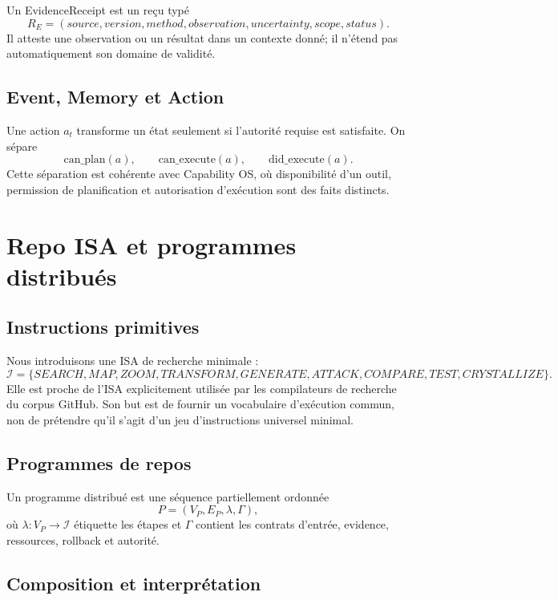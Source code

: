 \begin{definition}[EvidenceReceipt]
Un EvidenceReceipt est un reçu typé
\[
R_E=(source,version,method,observation,uncertainty,scope,status).
\]
Il atteste une observation ou un résultat dans un contexte donné; il n'étend pas automatiquement son domaine de validité.
\end{definition}

\section{Event, Memory et Action}

Une action $a_t$ transforme un état seulement si l'autorité requise est satisfaite. On sépare
\[
\mathrm{can\_plan}(a),\qquad \mathrm{can\_execute}(a),\qquad \mathrm{did\_execute}(a).
\]
Cette séparation est cohérente avec Capability OS, où disponibilité d'un outil, permission de planification et autorisation d'exécution sont des faits distincts.

\chapter{Repo ISA et programmes distribués}

\section{Instructions primitives}

Nous introduisons une ISA de recherche minimale :
\[
\mathcal I=\{SEARCH,MAP,ZOOM,TRANSFORM,GENERATE,ATTACK,COMPARE,TEST,CRYSTALLIZE\}.
\]
Elle est proche de l'ISA explicitement utilisée par les compilateurs de recherche du corpus GitHub. Son but est de fournir un vocabulaire d'exécution commun, non de prétendre qu'il s'agit d'un jeu d'instructions universel minimal.

\section{Programmes de repos}

Un programme distribué est une séquence partiellement ordonnée
\[
P=(V_P,E_P,\lambda,\Gamma),
\]
où $\lambda:V_P\to\mathcal I$ étiquette les étapes et $\Gamma$ contient les contrats d'entrée, evidence, ressources, rollback et autorité.

\section{Composition et interprétation}

